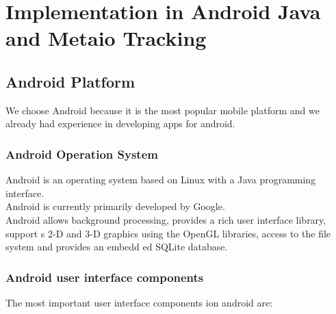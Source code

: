 
\chapter{Implementation in Android Java and Metaio Tracking} \label{chapter:metaio}
\section{Android Platform}
We choose Android because it is the most popular mobile platform and we already had experience in developing apps for android. 

\subsection{Android Operation System}
Android is an operating system based on Linux with a Java programming interface.
\\


Android is currently primarily developed by Google.
\\


Android allows background processing, provides a rich user interface library, support
s 2-D and 3-D
graphics using the OpenGL libraries, access to the file system and provides an embedd
ed SQLite
database.\cite{androidDevTut}

\subsection{Android user interface components}
The most important user interface components ion android are: 

